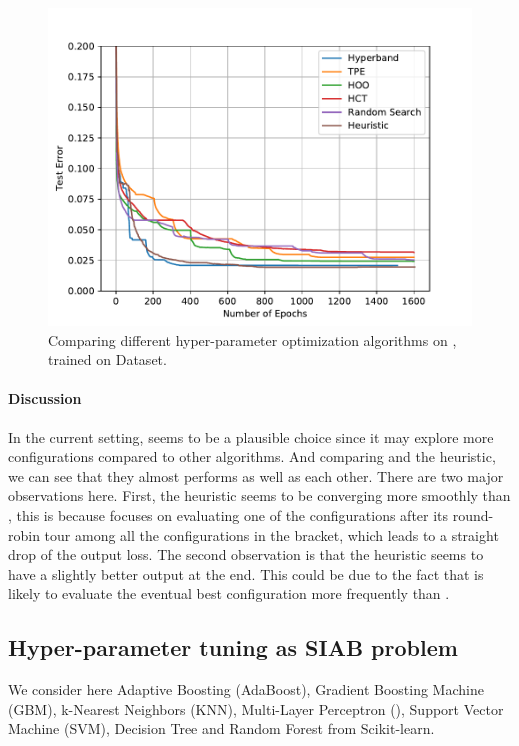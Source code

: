 \documentclass[twoside,11pt]{article}
\begin{document}
\begin{figure}[ht]
    \centering
    \includegraphics[scale=0.8]{img/mnist/mlp_0_bis.pdf}
    \caption{Comparing different hyper-parameter optimization algorithms on \MLP, trained on \MNIST Dataset.}
    \label{fig:mlp}
\end{figure}

\paragraph{\textbf{Discussion}} In the current setting, \Hyperband seems to be a plausible choice since it may explore more configurations compared to other algorithms. And comparing \Hyperband and the heuristic, we can see that they almost performs as well as each other. There are two major observations here. First, the heuristic seems to be converging more smoothly than \Hyperband, this is because \Hyperband focuses on evaluating one of the configurations after its round-robin tour among all the configurations in the bracket, which leads to a straight drop of the output loss. The second observation is that the heuristic seems to have a slightly better output at the end. This could be due to the fact that \TTTS is likely to evaluate the eventual best configuration more frequently than \SHA.


\subsection{Hyper-parameter tuning as SIAB problem}

We consider here Adaptive Boosting (AdaBoost), Gradient Boosting Machine (GBM), k-Nearest Neighbors (KNN), Multi-Layer Perceptron (\MLP), Support Vector Machine (SVM), Decision Tree and Random Forest from Scikit-learn.
\end{document}
